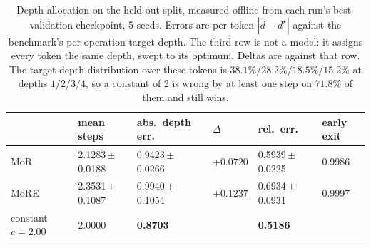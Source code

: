 \documentclass{article}
\begin{document}


\begin{table}[t]
\centering
\footnotesize
\caption{Depth allocation on the held-out split, measured offline from each
run's best-validation checkpoint, 5 seeds. Errors are per-token
$|{\hat{d}} - d^\star|$ against the benchmark's per-operation target depth.
The third row is not a model: it assigns every token the same depth, swept to
its optimum. Deltas are against that row. The target depth distribution over
these tokens is $38.1\%/28.2\%/18.5\%/15.2\%$ at depths $1/2/3/4$, so a
constant of 2 is wrong by at least one step on $71.8\%$ of them and still
wins.}
\label{tab:depth}
\vspace{2pt}
\begin{tabular}{llllll}
\toprule
& mean steps & abs.\ depth err. & $\Delta$ & rel.\ err. & early exit \\
\midrule
MoR  & 2.1283\,$\pm$\,0.0188 & 0.9423\,$\pm$\,0.0266 & $+0.0720$ & 0.5939\,$\pm$\,0.0225 & 0.9986 \\
MoRE & 2.3531\,$\pm$\,0.1087 & 0.9940\,$\pm$\,0.1054 & $+0.1237$ & 0.6934\,$\pm$\,0.0931 & 0.9997 \\
\midrule
constant $c = 2.00$ & 2.0000 & \textbf{0.8703} &  & \textbf{0.5186} &  \\
\bottomrule
\end{tabular}
\end{table}
\end{document}
